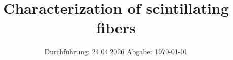 

\title{Characterization of scintillating fibers}
\date{%
  Durchführung: 24.04.2026
  \hspace{3em}
  Abgabe: \today
}



\maketitle
\thispagestyle{empty}
\tableofcontents
\newpage



% 



\printbibliography{}


 
